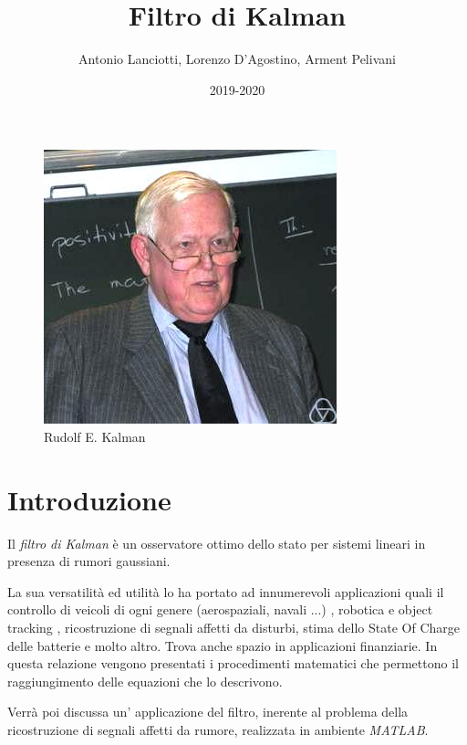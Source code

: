 \documentclass{article}
\title{Filtro di Kalman}
\author{Antonio Lanciotti, Lorenzo D'Agostino, Arment Pelivani}
\date{2019-2020}
\numberwithin{equation}{section}
\begin{document}
\maketitle

\begin{figure}[ht]
\centering
\includegraphics[scale=1]{Rudolf_Kalman} 
\caption{Rudolf E. Kalman}
\label{fig:kalman}
\end{figure}

\newpage

\tableofcontents

\newpage



\section{Introduzione}
Il \textit{filtro di Kalman} è un osservatore ottimo dello stato per sistemi lineari in presenza di rumori gaussiani.

La sua versatilità ed utilità lo ha portato ad innumerevoli applicazioni quali il controllo di veicoli di ogni genere (aerospaziali, navali ...)\cite{veicoli} , robotica e object tracking \cite{Vision}, ricostruzione di segnali affetti da disturbi, stima dello State Of Charge \cite{SOC} delle batterie e molto altro. Trova anche spazio in applicazioni finanziarie\cite{Finanza}.
In questa relazione vengono presentati i procedimenti matematici che permettono il raggiungimento delle equazioni che lo descrivono.

Verrà poi discussa un' applicazione del filtro, inerente al problema della ricostruzione di segnali affetti da rumore, realizzata in ambiente \textit{MATLAB}.

\newpage















\newpage
\nocite{conti}


\end{document}
